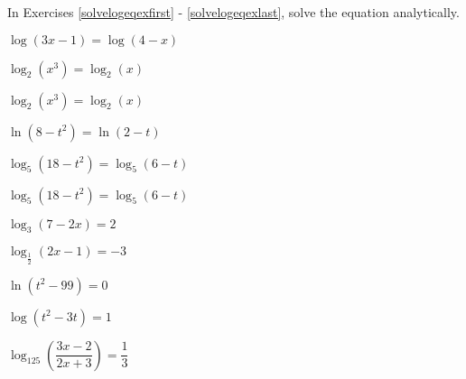 \documentclass{ximera}
\begin{document}
	\author{Stitz-Zeager}



\label{ExercisesforLogarithmicEquationsandInequalities}

\begin{problem}

In Exercises \ref{solvelogeqexfirst} - \ref{solvelogeqexlast}, solve the equation analytically.

\begin{question}\label{solvelogeqexfirst}
$\log(3x-1) = \log(4-x)$
\end{question}

\begin{question}
$\log_{2}\left(x^{3}\right) = \log_{2}(x)$
\end{question}

\begin{question}
$\log_{2}\left(x^{3}\right) = \log_{2}(x)$
\end{question}

\begin{question}
$\ln\left(8-t^2\right)=\ln(2-t)$ 
\end{question}

\begin{question}
$\log_{5}\left(18-t^2\right) = \log_{5}(6-t)$
\end{question}

\begin{question}
$\log_{5}\left(18-t^2\right) = \log_{5}(6-t)$
\end{question}

\begin{question}
$\log_{3}(7-2x) = 2$
\end{question}

\begin{question}
$\log_{\frac{1}{2}} (2x-1) = -3$
\end{question}

\begin{question}
$\ln\left(t^2-99\right) = 0$
\end{question}

\begin{question}
$\log(t^2-3t) = 1$
\end{question}

\begin{question}
$\log_{125} \left(\dfrac{3x-2}{2x+3}\right)=\dfrac{1}{3}$
\end{question}

\end{problem}
\end{document}
